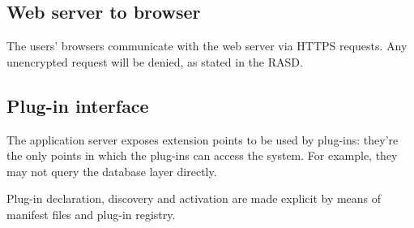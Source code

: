 \subsection{Web server to browser}
The users' browsers communicate with the web server via HTTPS requests. Any unencrypted request will be denied, as stated in the RASD.


\subsection{Plug-in interface}
The application server exposes extension points to be used by plug-ins: they're the only points in which the plug-ins can access the system. For example, they may not query the database layer directly.

Plug-in declaration, discovery and activation are made explicit by means of manifest files and plug-in registry.
